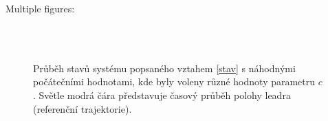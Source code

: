 \documentclass{article}
\begin{document}
\par Multiple figures: \\
\begin{figure}[H]%
    \centering
    \\
\\
%
    \caption{Průběh stavů systému popsaného vztahem \eqref{stav} s náhodnými počátečními hodnotami, kde byly voleny různé hodnoty parametru $c$. Světle modrá čára představuje časový průběh polohy leadra (referenční trajektorie). }%
\end{figure}
\end{document}
